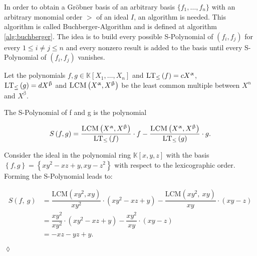 In order to obtain a Gröbner basis of an arbitrary basis $\{f_{1}, \ldots , f_{n}\}$ with an arbitrary monomial order $>$ of an ideal $I$, an algorithm is needed. This algorithm is called Buchberger-Algorithm and is defined at algorithm \ref{alg:buchberger}. The idea is to build every possible S-Polynomial of $\left( f_{i},f_{j}\right) $ for every $ 1 \leq i \neq j \leq n $ and every nonzero result is added to the basis until every S-Polynomial of $\left( f_{i},f_{j}\right) $ vanishes.

Let the polynomials $f,g \in \mathbb{K}\left[X_{1}, \dots, X_{n}\right] $ and $\textsc{LT}_{\leq}\left(f \right) = cX^{\upalpha} $, \\  $\textsc{LT}_{\leq}\left(g \right) = dX^{\upbeta} $ and $\textsc{LCM}\left( X^{\upalpha},X^{\upbeta}\right) $ be the least common multiple between $X^{\upalpha}$ and $X^{\upbeta}$. 

\begin{env_definition}[S-Polynomial]
\cite{KHZ} The S-Polynomial of f and g is the polynomial

\[ S\left( f,g\right) = \frac{\textsc{LCM}\left( X^{\upalpha}, X^{\upbeta}\right) }{\textsc{LT}_{\leq}\left( f\right) } \cdot f - \frac{ \textsc{LCM}\left( X^{\upalpha}, X^{\upbeta}\right) }{\textsc{LT}_{\leq}\left( g\right) } 
\cdot g. \]


\end{env_definition}

\newpage

\begin{env_example}\normalfont
Consider the ideal in the polynomial ring $\mathbb{K}\left[ x,y,z\right] $ with
the basis $\left\lbrace f,g\right\rbrace = \left\lbrace xy^{2}-xz+y,xy-z^{2} \right\rbrace $ with respect to the lexicographic order.\\
Forming the S-Polynomial leads to:

\begin{align*}
 S \left(f,~g\right) &= \dfrac{\textrm{LCM}\left( xy^{2}, xy \right) } {xy^{2} } \cdot \left(  xy^{2}-xz+y\right) - \dfrac{\textrm{LCM}\left( xy^{2},~xy \right) } {xy } \cdot \left( xy-z \right) \\ 
 &= \dfrac{xy^{2}}{xy^{2}} \cdot \left( xy^{2}-xz+y\right) - \dfrac{xy^{2}}{xy} \cdot \left( xy-z\right) \\
 &= -xz-yz+y. 
\end{align*}


\begin{flushright}
$\lozenge$
\end{flushright} 
\end{env_example}

